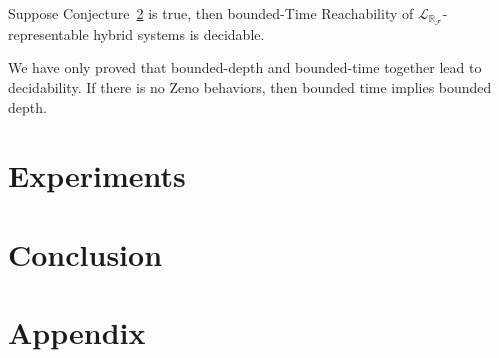 \documentclass[envcountsect]{llncs}
\newcommand{\lrf}{\mathcal{L}_{\mathbb{R}_{\mathcal{F}}}}
\begin{document}
\begin{proposition}
Suppose Conjecture~\ref{} is true, then bounded-Time Reachability of
$\lrf$-representable hybrid systems is decidable.
\end{proposition}
We have only proved that bounded-depth and bounded-time together lead to
decidability. If there is no Zeno behaviors, then bounded time implies bounded
depth.



\section{Experiments}

\section{Conclusion}








\newpage
\section*{Appendix}
\end{document}
